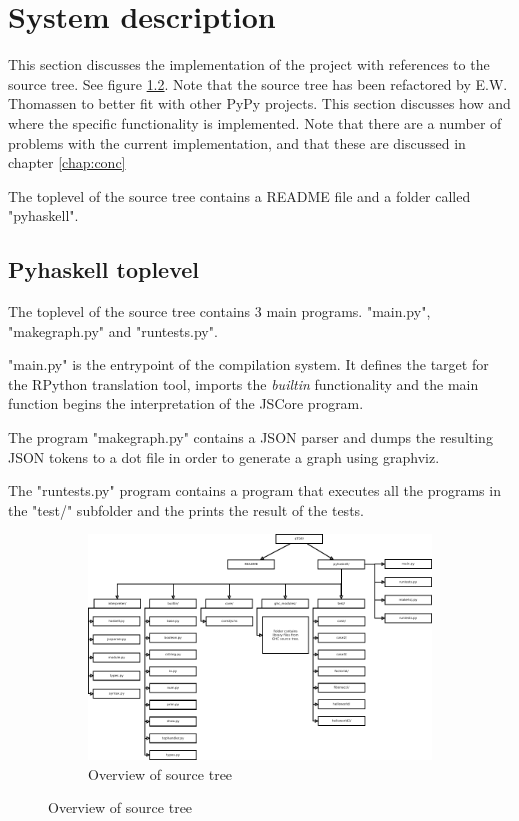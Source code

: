 

\chapter{System description}

This section discusses the implementation of the project with
references to the source tree. See figure \ref{fig:overview}.
Note that the source tree has been refactored by E.W. Thomassen
to better fit with other PyPy projects. This section discusses how
and where the specific functionality is implemented. Note that there
are a number of problems with the current implementation, and that
these are discussed in chapter \ref{chap:conc}

The toplevel of the source tree contains a README file and a folder
called "pyhaskell".

\section{Pyhaskell toplevel}

The toplevel of the source tree contains 3 main programs. "main.py",
"makegraph.py" and "runtests.py".

"main.py" is the entrypoint of the compilation system. It defines
the target for the RPython translation tool, imports the \emph{builtin}
functionality and the main function begins the interpretation of the
JSCore program.

The program "makegraph.py" contains a JSON parser and dumps the resulting
JSON tokens to a dot file in order to generate a graph using graphviz.

The "runtests.py" program contains a program that executes all the programs
in the "test/" subfolder and the prints the result of the tests.




\begin{figure}
\begin{figure}[H]
\centering
\includegraphics[width=\textheight]{../diags/overview.pdf}

\caption{Overview of source tree}
\label{fig:overview}

\end{figure}
\end{figure}




